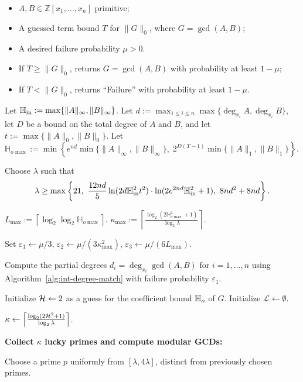 \documentclass{article}
\numberwithin{equation}{section}
\begin{document}
\begin{algorithm}
\caption{Polynomial GCD Algorithm over the Integers with a Given Term Bound}
\label{alg:intgcd-no-bounds}
\begin{algorithmic}[1]
\Require
    \begin{itemize}
        \item $A, B \in \mathbb{Z}[x_1,\dots,x_n]$ primitive;
        \item A guessed term bound $T$ for $\|G\|_0$, where $G = \gcd(A,B)$;
        \item A desired failure probability $\mu > 0$.
    \end{itemize}
\Ensure
    \begin{itemize}
        \item If $T \ge \|G\|_0$, returns $G = \gcd(A,B)$ with probability at least $1-\mu$;
        \item If $T < \|G\|_0$, returns ``Failure'' with probability at least $1-\mu$.
    \end{itemize}

\State Let $\mathbb{H}_{\rm in} := \max\{\|A\|_\infty, \|B\|_\infty\}$.
\State Let $d := \max_{1 \le i \le n} \max\{\deg_{x_i} A, \deg_{x_i} B\}$, let $D$ be a bound on the total degree of $A$ and $B$, and let $t := \max\{\|A\|_0, \|B\|_0\}$.
\State Let $\mathbb{H}_{o\max} := \min\left\{ e^{nd}\min\{\|A\|_{\infty},\|B\|_{\infty}\},\; 2^{D(T-1)}\min\{\|A\|_1,\|B\|_1 \}\right\}$.

\State Choose $\lambda$ such that
\[
\lambda \ge \max\left\{
    21,\ 
    \frac{12nd}{5} \ln(2d \Hi^2 t^2) \cdot \ln(2e^{2nd}\Hi^2+1),\ 
    8nd^2 + 8nd
\right\}.
\]\label{alg12-4}

\State $L_{\max} := \left\lceil \log_2 \log_2 \mathbb{H}_{o\max} \right\rceil$.  
\State $\kappa_{\max} := \left\lceil \frac{\log_2(2\mathbb{H}_{o\max}^2 + 1)}{\log_2 \lambda} \right\rceil$.  

\State Set $\varepsilon_1 \gets \mu/3$, $\varepsilon_2 \gets \mu/(3 \kappa^2_{\max})$, $\varepsilon_3 \gets \mu/(6 L_{\max})$.

\State Compute the partial degrees $d_i = \deg_{x_i} \gcd(A,B)$ for $i=1,\dots,n$ using Algorithm~\ref{alg:int-degree-match} with failure probability $\varepsilon_1$.\label{alg-14-step8} 

\State Initialize ${\mathcal{H}} \gets 2$ as a guess for the coefficient bound $\mathbb{H}_{o}$ of $G$.
\State Initialize $\mathcal{L} \gets \emptyset$.


    \State $\kappa \gets \left\lceil \frac{\log_2(2{\mathcal{H}}^2 + 1)}{\log_2 \lambda} \right\rceil$.

    \Statex \textbf{Collect $\kappa$ lucky primes and compute modular GCDs:}

    \While{$|\mathcal{L}| < \kappa$}
    \State Choose a prime $p$ uniformly from $[\lambda, 4\lambda]$, distinct from previously chosen primes.

\algstore{intgcd}
\end{algorithmic}
\end{algorithm}
\end{document}
